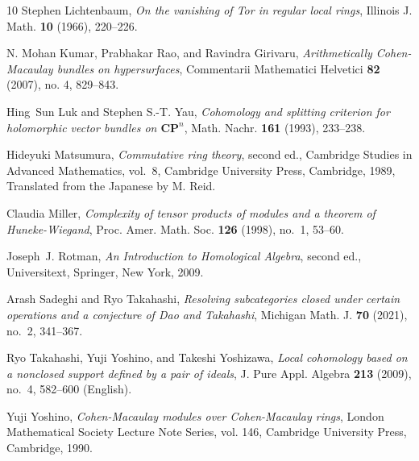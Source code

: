 \documentclass[11pt]{amsart}
\theoremstyle{definition}
\theoremstyle{definition}
\numberwithin{equation}{section}
\begin{document}
\begin{thebibliography}{10}
Stephen Lichtenbaum, \emph{On the vanishing of {T}or in regular local rings},
  Illinois J. Math. \textbf{10} (1966), 220--226.

N. Mohan Kumar, Prabhakar Rao, and Ravindra Girivaru,
\emph{Arithmetically Cohen-Macaulay bundles on hypersurfaces},
Commentarii Mathematici Helvetici \textbf{82} (2007),
no. 4, 829--843.

Hing~Sun Luk and Stephen S.-T. Yau, \emph{Cohomology and splitting criterion
  for holomorphic vector bundles on $\textbf{CP}^n$}, Math. Nachr. \textbf{161}
  (1993), 233--238.

Hideyuki Matsumura, \emph{Commutative ring theory}, second ed., Cambridge
  Studies in Advanced Mathematics, vol.~8, Cambridge University Press,
  Cambridge, 1989, Translated from the Japanese by M. Reid.

Claudia Miller, \emph{Complexity of tensor products of modules and a theorem of
  {H}uneke-{W}iegand}, Proc. Amer. Math. Soc. \textbf{126} (1998), no.~1,
  53--60.

Joseph~J. Rotman, \emph{An {I}ntroduction to {H}omological {A}lgebra}, second
  ed., Universitext, Springer, New York, 2009.

Arash Sadeghi and Ryo Takahashi, \emph{Resolving subcategories closed under
  certain operations and a conjecture of {D}ao and {T}akahashi}, Michigan Math.
  J. \textbf{70} (2021), no.~2, 341--367.

Ryo Takahashi, Yuji Yoshino, and Takeshi Yoshizawa, \emph{Local cohomology
  based on a nonclosed support defined by a pair of ideals}, J. Pure Appl.
  Algebra \textbf{213} (2009), no.~4, 582--600 (English).

Yuji Yoshino, \emph{Cohen-{M}acaulay modules over {C}ohen-{M}acaulay rings},
  London Mathematical Society Lecture Note Series, vol. 146, Cambridge
  University Press, Cambridge, 1990.

\end{thebibliography}
\end{document}
